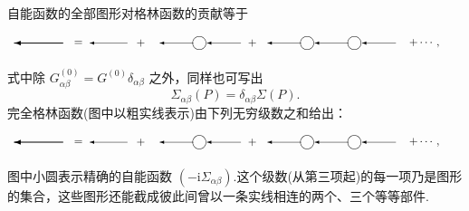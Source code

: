自能函数的全部图形对格林函数的贡献等于
\begin{equation}
  \setlength{\unitlength}{0.85pt}%
  \begin{picture}(480,26)(0,0)
    \tarrL{58}{12}{52}%
    \put(74,12){\makebox(0,0){$=$}}%
    \arrL{126}{12}{40}%
    \put(140,12){\makebox(0,0){$+$}}%
    \arrL{196}{12}{36}%
    \put(202,12){\circle{14}}%
    \arrL{246}{12}{36}%
    \put(258,12){\makebox(0,0){$+$}}%
    \arrL{310}{12}{36}%
    \put(316,12){\circle{14}}%
    \arrL{360}{12}{36}%
    \put(366,12){\circle{14}}%
    \arrL{410}{12}{36}%
    \put(424,12){\makebox(0,0)[l]{$+\cdots,$}}%
  \end{picture}
\end{equation}
式中除 $G^{(0)}_{\alpha\beta}=G^{(0)}\delta_{\alpha\beta}$ 之外，同样也可写出
\begin{equation}
  \Sigma_{\alpha\beta}(P)=\delta_{\alpha\beta}\Sigma(P).
\end{equation}
完全格林函数(图中以粗实线表示)由下列无穷级数之和给出：
\begin{equation}
  \setlength{\unitlength}{0.85pt}%
  \begin{picture}(480,26)(0,0)
    \tarrL{58}{12}{52}%
    \put(74,12){\makebox(0,0){$=$}}%
    \arrL{126}{12}{40}%
    \put(140,12){\makebox(0,0){$+$}}%
    \arrL{196}{12}{36}%
    \put(202,12){\circle{14}}%
    \arrL{246}{12}{36}%
    \put(258,12){\makebox(0,0){$+$}}%
    \arrL{310}{12}{36}%
    \put(316,12){\circle{14}}%
    \arrL{360}{12}{36}%
    \put(366,12){\circle{14}}%
    \arrL{410}{12}{36}%
    \put(424,12){\makebox(0,0)[l]{$+\cdots,$}}%
  \end{picture}
\end{equation}
图中小圆表示精确的自能函数 $(-\mathrm{i}\Sigma_{\alpha\beta})$.这个级数(从第三项起)的每一项乃是图形的集合，这些图形还能截成彼此间曾以一条实线相连的两个、三个等等部件.

